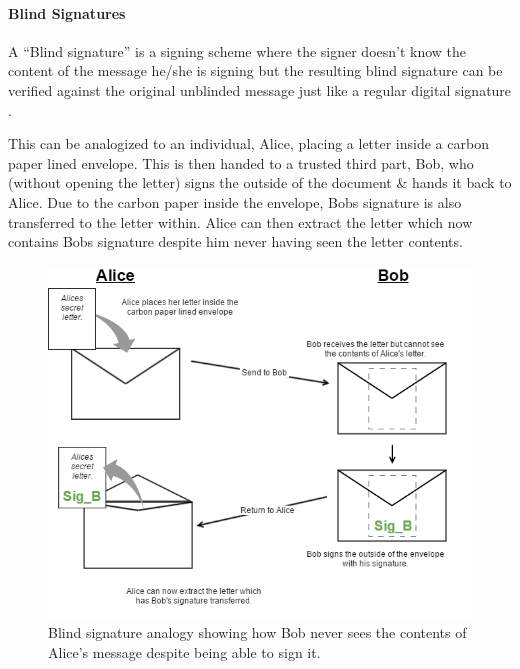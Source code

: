 \documentclass{article}
\begin{document}
\begin{adjustwidth}{0.5cm}{}
	\paragraph{Blind Signatures}
	\label{sec:BlindSignatures}
	\hfill \break \break

	A ``Blind signature'' is a signing scheme where the signer doesn't know the content of the message he/she is signing but the resulting blind signature can be verified against the original unblinded message just like a regular digital signature \citep{64_ryan_2017}.

	This can be analogized to an individual, Alice, placing a letter inside a carbon paper lined envelope. This is then handed to a trusted third part, Bob, who (without opening the letter) signs the outside of the document \& hands it back to Alice. Due to the carbon paper inside the envelope, Bobs signature is also transferred to the letter within. Alice can then extract the letter which now contains Bobs signature despite him never having seen the letter contents.

	\begin{figure}[h]
	\begin{adjustwidth}{0.5cm}{}
	  	\includegraphics[width=\textwidth]{Blind_Signatures}
		\caption{Blind signature analogy showing how Bob never sees the contents of Alice's message despite being able to sign it.}
	\end{adjustwidth}
	\end{figure}



\end{adjustwidth}
\end{document}
